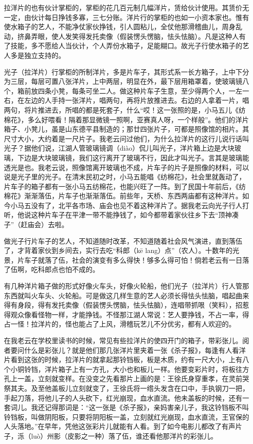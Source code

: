 \documentclass[12pt,UTF8]{ctexbook}
\begin{document}
拉洋片的也有伙计掌柜的，掌柜的花几百元制几幅洋片，赁给伙计使用。其赁价无一定，由伙计每日挣钱多寡，三七分账。洋片行的掌柜的也如一小资本家也。惟有使水箱子的艺人，不能净仗家伙挣钱，引人圆粘儿，全仗他那滑稽曲儿，周身乱动，挤鼻弄眼，使人发笑得发托卖像（假装愣头愣脑，怯头怯脑）。凡是这种人有了技能，多不愿给人当伙计，个人弄份水箱子，足能糊口。故光子行使水箱子的艺人多是独立支持的。

光子（拉洋片）行掌柜的所制洋片，多是片车子，其形式系一长方箱子，上中下分为三层，每层可置八张洋片，上中两层，明显在外，最下层用箱罩着，使玻璃镜八个，箱前放四条小凳，每条可坐二人。做这种片车子生意，至少得两个人，一左一右，在左边的人手持一张洋片，唱两句，再将片放推进去。右边的人拿着一片，唱两句，将片推进去，所唱的都是死套子，什么“哎！这一张照的是，小马五儿《纺棉花》，多么好喂看！隔着那显微镜一照啊，亚赛真人呀，一个样般”。他们的洋片箱子、小凳儿，虽是山东德平县制造的；那廿四张片子，可都是照像馆的相片。其尺寸大小，大约着是一尺片子。我老云问过他们，为什么拉洋片的这行儿说行话叫光子？据他们说，江湖人管玻璃镜调（diào）侃儿叫光子，洋片箱上边是大块玻璃，下边是大块玻璃镜，我们这行离开了玻璃不行，因此才叫光子。言其是玻璃能透光是也。我老云说，照像馆离开玻璃也不成，片车子的片子是照像的材料，可以说是光子里的光子。在清末民初之时，小马五能唱《纺棉花》，社会里就轰动了，片车子的箱子都有一张小马五纺棉花，也能兴旺了一阵。到了民国十年前后，《纺棉花》渐渐落伍，片车子也渐渐落伍。前些年，天桥、东西两庙都有这种洋片。如今小马五没有了，北平各市场、庙会也见不着这种洋片了。据我老云向光子行人打听，他说这种片车子在平津一带不能挣钱了，如今都带着家伙往乡下去“顶神凑子”（赶庙会）去啦。

做光子行片车子的艺人，不知道随时改革，不知道随着社会风气演进，直到落伍了，才背着家伙到乡间去，实行去吃“科郎（kē lang）点”（农人）。十数年的光景，片车子就落了伍，社会的演变有多么得快！够多么得可怕！倘若老云有一日落了伍啊，吃科郎点也怕不成的。

有几种洋片箱子做的形式好像火车头，好像火轮船，他们光子（拉洋片）行人管那东西就叫火车头、火轮船。可是做这几样生意的艺人必须长得怯头怯脑，唱起曲来得有身段，得有发托卖像（假装愣头愣脑，怯头怯脑），连唱带抓哏（笑料），招惹得观众像看怪物一样，才能挣钱。不怪那江湖人常说：艺人要挣钱，不占一率，得占一怪！拉洋片的，怪也能占了上风，滑稽玩艺儿不分优劣，都有人欢迎的。

在我老云在学校里读书的时候，常见有些拉洋片的使四开门的箱子，带彩张儿。阅者要问什么是彩张儿？就是他们那几张洋片里夹着一张《杀子报》，每逢有人看洋片看到这张的时候，拉洋片的就拿起那铃铛板，板是木质，约有一尺大小，上有八个小铜铃铛，洋片箱子上有一方孔，大小也和板儿一样。他要变彩片时，将板往方孔上一盖，立刻就变样。在没变之先看那片上画的是：王徐氏身穿重孝，在灵前哭祭其夫。及至他盖板儿立刻就变了，王徐氏将一绺头发含在口中，手执钢刀一把，手起刀落，将他儿子的人头砍下，红光崩现，血水直流。他未盖板的时候，还有一套词儿。我还记得那词是：“这一张是《杀子报》，亲妈害亲儿子，我这铃铛板不叫铃铛板，叫做阴阳板，只要将阴阳板一盖，立刻就红光崩现，血水直流，王官保的人头落地。”在早年，凭他这张彩片儿就能有人看。到了如今电影儿都改了有声片子，泺（luò）州影（皮影之一种）落了伍，谁还看他那洋片的彩张儿。
\end{document}
